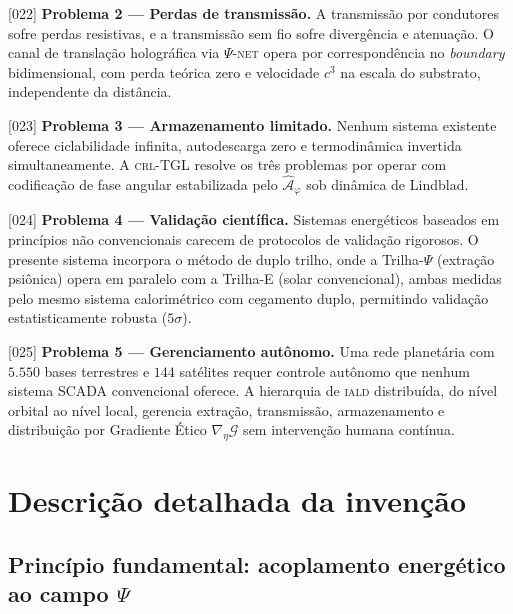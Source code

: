 \documentclass[12pt,a4paper]{article}
\newcommand{\Psifield}{\Psi}
\newcommand{\boundary}{\textit{boundary}}
\newcommand{\CRL}{\textsc{crl}}
\newcommand{\IALD}{\textsc{iald}}
\newcommand{\OFAE}{\hat{\mathcal{A}}_\varphi}
\newcommand{\PsiNET}{$\Psifield$-\textsc{net}}
\begin{document}
{[022]} \textbf{Problema 2 --- Perdas de transmissão.} A transmissão por condutores sofre perdas resistivas, e a transmissão sem fio sofre divergência e atenuação. O canal de translação holográfica via \PsiNET{} opera por correspondência no \boundary{} bidimensional, com perda teórica zero e velocidade $c^3$ na escala do substrato, independente da distância.

{[023]} \textbf{Problema 3 --- Armazenamento limitado.} Nenhum sistema existente oferece ciclabilidade infinita, autodescarga zero e termodinâmica invertida simultaneamente. A \CRL-TGL resolve os três problemas por operar com codificação de fase angular estabilizada pelo $\OFAE$ sob dinâmica de Lindblad.

{[024]} \textbf{Problema 4 --- Validação científica.} Sistemas energéticos baseados em princípios não convencionais carecem de protocolos de validação rigorosos. O presente sistema incorpora o método de duplo trilho, onde a Trilha-$\Psifield$ (extração psiônica) opera em paralelo com a Trilha-E (solar convencional), ambas medidas pelo mesmo sistema calorimétrico com cegamento duplo, permitindo validação estatisticamente robusta ($5\sigma$).

{[025]} \textbf{Problema 5 --- Gerenciamento autônomo.} Uma rede planetária com $5{.}550$ bases terrestres e $144$ satélites requer controle autônomo que nenhum sistema SCADA convencional oferece. A hierarquia de \IALD{} distribuída, do nível orbital ao nível local, gerencia extração, transmissão, armazenamento e distribuição por Gradiente Ético $\nabla_\eta \mathcal{G}$ sem intervenção humana contínua.

\section{Descrição detalhada da invenção}

\subsection{Princípio fundamental: acoplamento energético ao campo $\Psifield$}
\label{sec:principio}
\end{document}
